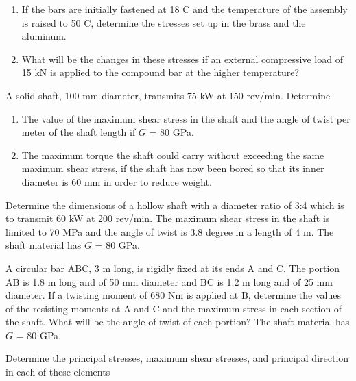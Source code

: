 \documentclass[
10pt,
a4paper,
openany,
svgnames,
]{book}
\newcommand{\AxisRotator}[1][rotate=0]{%
    \tikz[x=0.25cm,y=0.60cm,line width=.2ex,-stealth,#1] \draw(0,0) arc (150:-150:1 and 1);%
}
\newcommand{\exercise}{%
\item \label{lab:\arabic{chapter}.\arabic{exercisesi}}  %
}
\begin{document}
\begin{exercises}
  \begin{enumerate}
  \item If the bars are initially fastened at 18 C and the temperature of the assembly is raised to 50 C, determine the stresses set up in the brass and the aluminum.
  \item What will be the changes in these stresses if an external compressive load of 15 kN is applied to the compound bar at the higher temperature?
  \end{enumerate}
  
  \exercise A solid shaft, 100 mm diameter, transmits 75 kW at 150 rev/min. Determine

    \begin{figure}[H]
    \centering
  \end{figure}
  
  \begin{enumerate}
  \item The value of the maximum shear stress in the shaft and the angle of twist per meter of the shaft length if $G$ = 80 GPa.
  \item The maximum torque the shaft could carry without exceeding the same maximum shear stress, if the shaft has now been bored so that its inner diameter is 60 mm in order to reduce weight.
  \end{enumerate}
  \exercise Determine the dimensions of a hollow shaft with a diameter ratio of 3:4 which is to transmit 60 kW at 200 rev/min. The maximum shear stress in the shaft is limited to 70 MPa and the angle of twist is 3.8 degree in a length of 4 m. The shaft material has $G$ = 80 GPa.
  \exercise A circular bar ABC, 3 m long, is rigidly fixed at its ends A and C. The portion AB is 1.8 m long and of 50 mm diameter and BC is 1.2 m long and of 25 mm diameter. If a twisting moment of 680 Nm is applied at B, determine the values of the resisting moments at A and C and the maximum stress in each section of the shaft. What will be the angle of twist of each portion? The shaft material has $G$ = 80 GPa.
  \exercise Determine the principal stresses, maximum shear stresses, and principal direction in each of these elements
  

\end{exercises}
\end{document}
